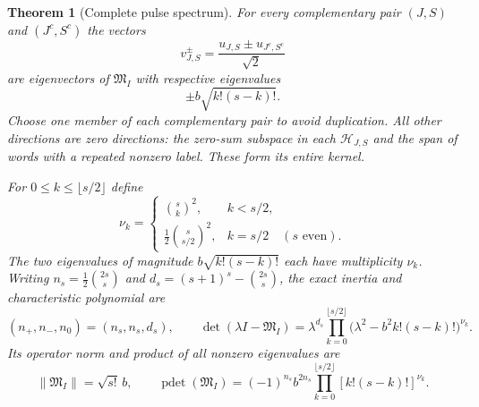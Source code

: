 \documentclass[11pt,a4paper]{article}
\newtheorem{theorem}{Theorem}[section]
\theoremstyle{definition}\newtheorem{definition}[theorem]{Definition}
\providecommand{\pdet}{\operatorname{pdet}}
\begin{document}
\begin{theorem}[Complete pulse spectrum]\label{fms:fms:inertia}
For every complementary pair $(J,S)$ and $(J^c,S^c)$ the vectors
\begin{equation}\tag{FMS25}\label{fms:fms:eigenvectors}
 v_{J,S}^{\pm}=
        \frac{u_{J,S}\pm u_{J^c,S^c}}{\sqrt2}
\end{equation}
are eigenvectors of $\mathfrak M_I$ with respective eigenvalues
\[
 \pm b\sqrt{k!(s-k)!}.
\]
Choose one member of each complementary pair to avoid duplication.
All other directions are zero directions: the zero-sum subspace
in each $\mathcal H_{J,S}$ and the span of words with a repeated
nonzero label. These form its entire kernel.

For $0\le k\le\lfloor s/2\rfloor$ define
\begin{equation}\tag{FMS26}\label{fms:fms:multiplicities}
 \nu_k=
 \begin{cases}
 \binom{s}{k}^2,&k<s/2,\\[1mm]
 \frac12\binom{s}{s/2}^2,&k=s/2\quad(s\text{ even}).
 \end{cases}
\end{equation}
The two eigenvalues of magnitude $b\sqrt{k!(s-k)!}$ each
have multiplicity $\nu_k$. Writing
$n_s=\frac12\binom{2s}{s}$ and
$d_s=(s+1)^s-\binom{2s}{s}$, the exact inertia and
characteristic polynomial are
\begin{equation}\tag{FMS27}\label{fms:fms:inertiapoly}
 (n_+,n_-,n_0)=(n_s,n_s,d_s),\qquad
 \det(\lambda I-\mathfrak M_I)=
 \lambda^{d_s}\prod_{k=0}^{\lfloor s/2\rfloor}
       \bigl(\lambda^2-b^2 k!(s-k)!\bigr)^{\nu_k}.
\end{equation}
Its operator norm and product of all nonzero eigenvalues are
\begin{equation}\tag{FMS28}\label{fms:fms:normpdet}
 \|\mathfrak M_I\|=\sqrt{s!}\,b,\qquad
 \pdet(\mathfrak M_I)=
 (-1)^{n_s}b^{2n_s}
       \prod_{k=0}^{\lfloor s/2\rfloor}
                    [k!(s-k)!]^{\nu_k}.
\end{equation}
\end{theorem}
\end{document}
